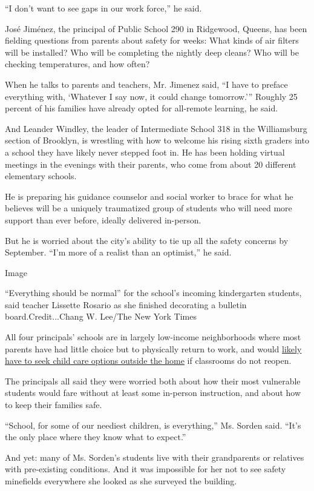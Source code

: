 ``I don't want to see gaps in our work force,'' he said.

José Jiménez, the principal of Public School 290 in Ridgewood, Queens,
has been fielding questions from parents about safety for weeks: What
kinds of air filters will be installed? Who will be completing the
nightly deep cleans? Who will be checking temperatures, and how often?

When he talks to parents and teachers, Mr. Jimenez said, ``I have to
preface everything with, `Whatever I say now, it could change
tomorrow.''' Roughly 25 percent of his families have already opted for
all-remote learning, he said.

And Leander Windley, the leader of Intermediate School 318 in the
Williamsburg section of Brooklyn, is wrestling with how to welcome his
rising sixth graders into a school they have likely never stepped foot
in. He has been holding virtual meetings in the evenings with their
parents, who come from about 20 different elementary schools.

He is preparing his guidance counselor and social worker to brace for
what he believes will be a uniquely traumatized group of students who
will need more support than ever before, ideally delivered in-person.

But he is worried about the city's ability to tie up all the safety
concerns by September. ``I'm more of a realist than an optimist,'' he
said.

Image

``Everything should be normal'' for the school's incoming kindergarten
students, said teacher Lissette Rosario as she finished decorating a
bulletin board.Credit...Chang W. Lee/The New York Times

All four principals' schools are in largely low-income neighborhoods
where most parents have had little choice but to physically return to
work, and would
\href{https://www.nytimes3xbfgragh.onion/2020/07/10/nyregion/nyc-school-daycare-reopening.html}{likely
have to seek child care options outside the home} if classrooms do not
reopen.

The principals all said they were worried both about how their most
vulnerable students would fare without at least some in-person
instruction, and about how to keep their families safe.

``School, for some of our neediest children, is everything,'' Ms. Sorden
said. ``It's the only place where they know what to expect.''

And yet: many of Ms. Sorden's students live with their grandparents or
relatives with pre-existing conditions. And it was impossible for her
not to see safety minefields everywhere she looked as she surveyed the
building.

